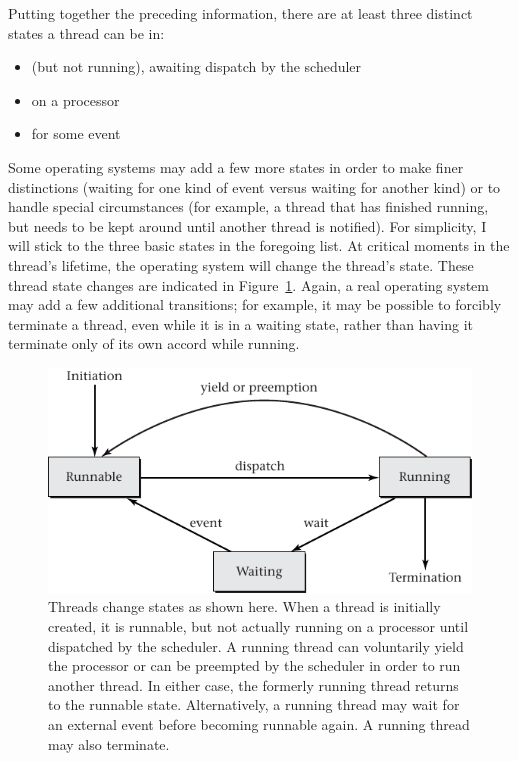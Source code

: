 Putting together the preceding information, there are at least
three distinct states a thread can be in:
\begin{itemize}
\item {} (but not running), awaiting dispatch by the scheduler
\item {} on a processor
\item {} for some event
\end{itemize}
Some operating systems may add a few more states in order to make
finer distinctions (waiting for one kind of event versus waiting for
another kind) or to handle special circumstances (for example, a thread that
has finished running, but needs to be kept around until another thread
is notified).  For simplicity, I will stick to the three basic states
in the foregoing list.  At critical moments in the thread's lifetime, the
operating system will change the thread's state.  These thread state
changes are indicated in Figure~\ref{state-diagram}. Again, a real
operating system may add a few additional transitions; for example, it
may be possible to forcibly terminate a thread, even while it is in a
waiting state, rather than having it terminate only of its own accord
while running.
\begin{figure}
\centerline{\includegraphics{hail_f0303}}
\caption{Threads change states as shown here. When a thread is initially created, it is runnable, but not
  actually running on a processor until dispatched by the scheduler.
  A running thread can voluntarily yield the processor or can be preempted
  by the scheduler in order to run another thread.  In either case,
  the formerly running thread returns to the runnable state.
  Alternatively, a running thread may wait for an external event before becoming runnable again. A running thread may also terminate.}
\label{state-diagram}
\end{figure}

